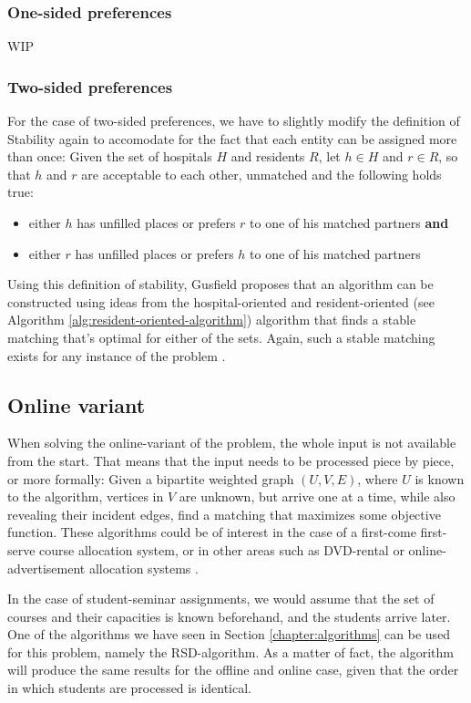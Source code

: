 \subsubsection{One-sided preferences}
WIP

\subsubsection{Two-sided preferences}
For the case of two-sided preferences, we have to slightly modify the definition of Stability again to accomodate for the fact that each entity can be assigned more than once: Given the set of hospitals $H$ and residents $R$, let $h \in H$ and $r \in R$, so that $h$ and $r$ are acceptable to each other, unmatched and the following holds true: 
\begin{itemize}
    \item either $h$ has unfilled places or prefers $r$ to one of his matched partners \textbf{and}
    \item either $r$ has unfilled places or prefers $h$ to one of his matched partners
\end{itemize}
Using this definition of stability, Gusfield\cite{Gusfield} proposes that an algorithm can be constructed using ideas from the hospital-oriented and resident-oriented (see Algorithm \ref{alg:resident-oriented-algorithm}) algorithm that finds a stable matching that's optimal for either of the sets. Again, such a stable matching exists for any instance of the problem \cite{Gusfield}.

\subsection{Online variant}
When solving the online-variant of the problem, the whole input is not available from the start. That means that the input needs to be processed piece by piece, or more formally: Given a bipartite weighted graph $(U, V, E)$, where $U$ is known to the algorithm, vertices in $V$ are unknown, but arrive one at a time, while also revealing their incident edges, find a matching that maximizes some objective function. These algorithms could be of interest in the case of a first-come first-serve course allocation system, or in other areas such as DVD-rental or online-advertisement allocation systems \cite{Mehta:Online}.

In the case of student-seminar assignments, we would assume that the set of courses and their capacities is known beforehand, and the students arrive later. One of the algorithms we have seen in Section \ref{chapter:algorithms} can be used for this problem, namely the RSD-algorithm. As a matter of fact, the algorithm will produce the same results for the offline and online case, given that the order in which students are processed is identical.

